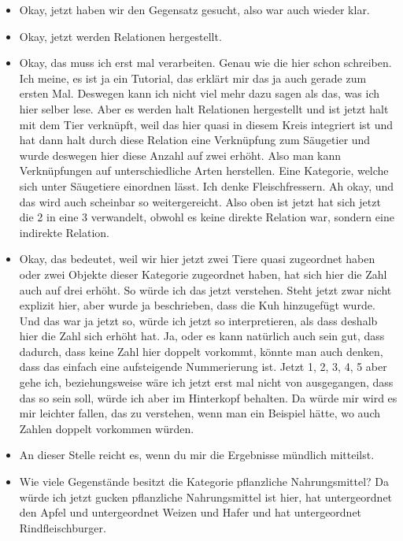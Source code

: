 {\begin{itemize}[]
            \item {} Okay, jetzt haben wir den Gegensatz gesucht, also war auch wieder klar.
            \item {} Okay, jetzt werden Relationen hergestellt.
            \item {} Okay, das muss ich erst mal verarbeiten.
                  Genau wie die hier schon schreiben.
                  Ich meine, es ist ja ein Tutorial, das erklärt mir das ja auch gerade zum ersten Mal.
                  Deswegen kann ich nicht viel mehr dazu sagen als das, was ich hier selber lese.
                  Aber es werden halt Relationen hergestellt und ist jetzt halt mit dem Tier verknüpft, weil das hier quasi in diesem Kreis integriert ist und hat dann halt durch diese Relation eine Verknüpfung zum Säugetier und wurde deswegen hier diese Anzahl auf zwei erhöht.
                  Also man kann Verknüpfungen auf unterschiedliche Arten herstellen.
                  Eine Kategorie, welche sich unter Säugetiere einordnen lässt.
                  Ich denke Fleischfressern. Ah okay, und das wird auch scheinbar so weitergereicht.
                  Also oben ist jetzt hat sich jetzt die 2 in eine 3 verwandelt, obwohl es keine direkte Relation war, sondern eine indirekte Relation.
            \item {} Okay, das bedeutet, weil wir hier jetzt zwei Tiere quasi zugeordnet haben oder zwei Objekte dieser Kategorie zugeordnet haben, hat sich hier die Zahl auch auf drei erhöht.
                  So würde ich das jetzt verstehen.
                  Steht jetzt zwar nicht explizit hier, aber wurde ja beschrieben, dass die Kuh hinzugefügt wurde.
                  Und das war ja jetzt so, würde ich jetzt so interpretieren, als dass deshalb hier die Zahl sich erhöht hat.
                  Ja, oder es kann natürlich auch sein gut, dass dadurch, dass keine Zahl hier doppelt vorkommt, könnte man auch denken, dass das einfach eine aufsteigende Nummerierung ist.
                  Jetzt 1, 2, 3, 4, 5 aber gehe ich, beziehungsweise wäre ich jetzt erst mal nicht von ausgegangen, dass das so sein soll, würde ich aber im Hinterkopf behalten.
                  Da würde mir wird es mir leichter fallen, das zu verstehen, wenn man ein Beispiel hätte, wo auch Zahlen doppelt vorkommen würden.
            \item {} An dieser Stelle reicht es, wenn du mir die Ergebnisse mündlich mitteilst.
            \item {} Wie viele Gegenstände besitzt die Kategorie pflanzliche Nahrungsmittel? Da würde ich jetzt gucken pflanzliche Nahrungsmittel ist hier, hat untergeordnet den Apfel und untergeordnet Weizen und Hafer und hat untergeordnet Rindfleischburger.

\end{itemize}}
